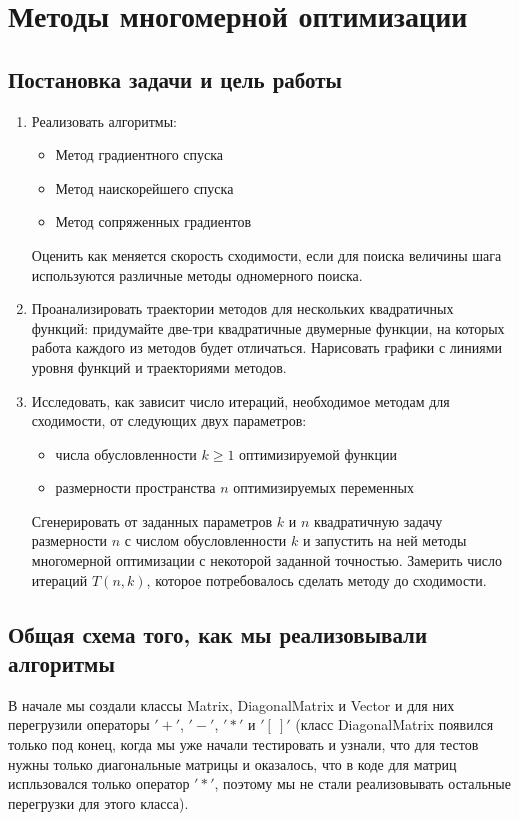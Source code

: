 \chapter{Методы многомерной оптимизации}


\section{Постановка задачи и цель работы}

\begin{enumerate}
    \item Реализовать алгоритмы:
    \begin{itemize}
        \item 	Метод градиентного спуска
        \item   Метод наискорейшего спуска
        \item   Метод сопряженных градиентов
    \end{itemize}
    Оценить как меняется скорость сходимости, если для поиска величины шага используются
    различные методы одномерного поиска.
    \item Проанализировать траектории методов для нескольких квадратичных
    функций: придумайте две-три квадратичные двумерные функции, на которых
    работа каждого из методов будет отличаться. Нарисовать графики с линиями
    уровня функций и траекториями методов.
    \item Исследовать, как зависит число итераций, необходимое методам для
    сходимости, от следующих двух параметров:
    \begin{itemize}
        \item числа обусловленности $k \geq 1$ оптимизируемой функции
        \item размерности пространства $n$ оптимизируемых переменных
    \end{itemize}
    Сгенерировать от заданных параметров $k$ и $n$ квадратичную задачу размерности $n$ с числом обусловленности
    $k$ и запустить на ней методы многомерной оптимизации с некоторой заданной точностью. Замерить число итераций $T(n, k)$, которое 
    потребовалось сделать методу до сходимости.
\end{enumerate}

\newpage
\section{Общая схема того, как мы реализовывали алгоритмы}

В начале мы создали классы Matrix, DiagonalMatrix и Vector и для них перегрузили операторы $'+'$, $'-'$, $'*'$ и $'[\ ]'$
 (класс DiagonalMatrix появился только под конец, когда мы уже начали тестировать и узнали, что для тестов нужны только 
 диагональные матрицы и оказалось, что в коде для матриц испльзовался только оператор $'*'$, поэтому мы не стали реализовывать остальные 
 перегрузки для этого класса).

